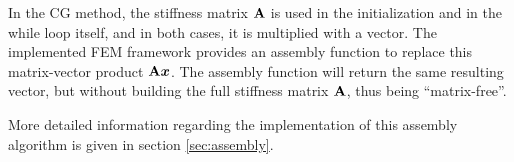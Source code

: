 In the CG method, the stiffness matrix $\mathbf{A}$ is used in the initialization and in the while loop itself, and in both cases, it is multiplied with a vector.
The implemented FEM framework provides an assembly function to replace this matrix-vector product $\mathbf{A}\boldsymbol{x}$.
The assembly function will return the same resulting vector, but without building the full stiffness matrix $\mathbf{A}$, thus being ``matrix-free''.

More detailed information regarding the implementation of this assembly algorithm is given in section \ref{sec:assembly}.

